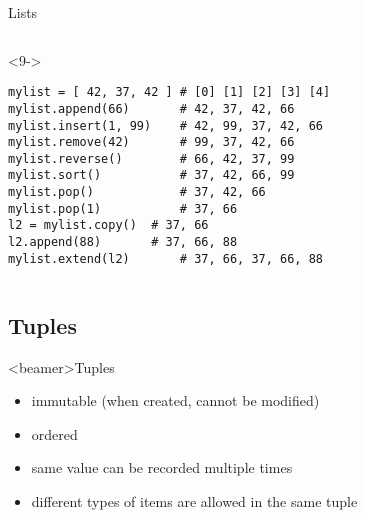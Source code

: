 \begin{frame}[fragile]{Lists}
\begin{center}
\begin{columns}[onlytextwidth]
\begin{column}{\textwidth}
      \begin{onlyenv}<9->
        \begin{lstlisting}[style=python,morekeywords={for, in, range, list}]
mylist = [ 42, 37, 42 ] # [0] [1] [2] [3] [4]
mylist.append(66)       # 42, 37, 42, 66
mylist.insert(1, 99)    # 42, 99, 37, 42, 66
mylist.remove(42)       # 99, 37, 42, 66
mylist.reverse()        # 66, 42, 37, 99
mylist.sort()           # 37, 42, 66, 99
mylist.pop()            # 37, 42, 66
mylist.pop(1)           # 37, 66
l2 = mylist.copy()  # 37, 66
l2.append(88)       # 37, 66, 88
mylist.extend(l2)       # 37, 66, 37, 66, 88 \end{lstlisting}
      \end{onlyenv}

    \end{column}
  \end{columns}

  \end{center}

\end{frame}


\subsection{Tuples}

\begin{frame}<beamer>{Tuples}

  \begin{itemize}
    \item<1-> immutable (when created, cannot be modified)
    \item<2-> ordered
    \item<3-> same value can be recorded multiple times
    \item<4-> different types of items are allowed in the same tuple
  \end{itemize}

\end{frame}


